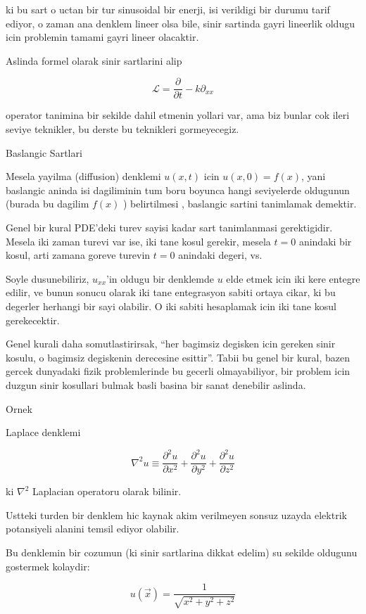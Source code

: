 \documentclass[12pt,fleqn]{article}
\begin{document}
ki bu sart o uctan bir tur sinusoidal bir enerji, isi verildigi bir durumu
tarif ediyor, o zaman ana denklem lineer olsa bile, sinir sartinda gayri
lineerlik oldugu icin problemin tamami gayri lineer olacaktir. 

Aslinda formel olarak sinir sartlarini alip 

\[ \mathcal{L}  = \frac{\partial }{\partial t} - k \partial_{xx}\]

operator tanimina bir sekilde dahil etmenin yollari var, ama biz bunlar cok
ileri seviye teknikler, bu derste bu teknikleri gormeyecegiz. 

Baslangic Sartlari

Mesela yayilma (diffusion) denklemi $u(x,t)$ icin $u(x,0) = f(x)$, yani
baslangic aninda isi dagiliminin tum boru boyunca hangi seviyelerde
oldugunun (burada bu dagilim $f(x)$ ) belirtilmesi , baslangic sartini
tanimlamak demektir.

Genel bir kural PDE'deki turev sayisi kadar sart tanimlanmasi
gerektigidir. Mesela iki zaman turevi var ise, iki tane kosul gerekir,
mesela $t=0$ anindaki bir kosul, arti zamana goreve turevin $t=0$ anindaki
degeri, vs. 

Soyle dusunebiliriz, $u_{xx}$'in oldugu bir denklemde $u$ elde etmek icin
iki kere entegre edilir, ve bunun sonucu olarak iki tane entegrasyon sabiti
ortaya cikar, ki bu degerler herhangi bir sayi olabilir. O iki sabiti
hesaplamak icin iki tane kosul gerekecektir. 

Genel kurali daha somutlastirirsak, ``her bagimsiz degisken icin gereken
sinir kosulu, o bagimsiz degiskenin derecesine esittir''. Tabii bu genel
bir kural, bazen gercek dunyadaki fizik problemlerinde bu gecerli
olmayabiliyor, bir problem icin duzgun sinir kosullari bulmak basli basina
bir sanat denebilir aslinda. 

Ornek

Laplace denklemi

\[ \nabla^2 u \equiv \frac{\partial ^2u}{\partial x^2} + 
\frac{\partial ^2u}{\partial y^2}  +
\frac{\partial ^2u}{\partial z^2} 
\]

ki $\nabla^2$ Laplacian operatoru olarak bilinir. 

Ustteki turden bir denklem hic kaynak akim verilmeyen sonsuz uzayda
elektrik potansiyeli alanini temsil ediyor olabilir. 

Bu denklemin bir cozumun (ki sinir sartlarina dikkat edelim) su sekilde
oldugunu gostermek kolaydir:

\[ u(\vec{x}) = \frac{1}{\sqrt{x^2+y^2+z^2}} \]
\end{document}
